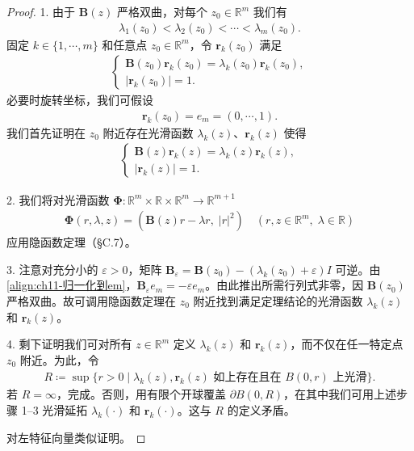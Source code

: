 \documentclass[../../main.tex]{subfiles}
\begin{document}
\begin{proof}
1. 由于 $\mathbf{B}(z)$ 严格双曲，对每个 $z_0\in\mathbb{R}^m$ 我们有
\begin{align*}
\lambda_1(z_0)<\lambda_2(z_0)<\cdots<\lambda_m(z_0).
\end{align*}
固定 $k\in\{1,\cdots,m\}$ 和任意点 $z_0\in\mathbb{R}^m$，令 $\mathbf{r}_k(z_0)$ 满足
\begin{align*}
\begin{cases}
\mathbf{B}(z_0)\mathbf{r}_k(z_0)=\lambda_k(z_0)\mathbf{r}_k(z_0),\\
|\mathbf{r}_k(z_0)|=1.
\end{cases}
\end{align*}
必要时旋转坐标，我们可假设
\begin{align}
\mathbf{r}_k(z_0)=e_m=(0,\cdots,1).
\label{align:ch11-归一化到em}
\end{align}
我们首先证明在 $z_0$ 附近存在光滑函数 $\lambda_k(z)$、$\mathbf{r}_k(z)$ 使得
\begin{align*}
\begin{cases}
\mathbf{B}(z)\mathbf{r}_k(z)=\lambda_k(z)\mathbf{r}_k(z),\\
|\mathbf{r}_k(z)|=1.
\end{cases}
\end{align*}

2. 我们将对光滑函数 $\boldsymbol{\Phi}:\mathbb{R}^m\times\mathbb{R}\times\mathbb{R}^m\to\mathbb{R}^{m+1}$
\begin{align*}
\boldsymbol{\Phi}(r,\lambda,z)=(\mathbf{B}(z)r-\lambda r,\;|r|^2) \quad (r,z\in\mathbb{R}^m,\;\lambda\in\mathbb{R})
\end{align*}
应用隐函数定理（\S C.7）。

3. 注意对充分小的 $\varepsilon>0$，矩阵 $\mathbf{B}_\varepsilon=\mathbf{B}(z_0)-(\lambda_k(z_0)+\varepsilon)I$ 可逆。由\eqref{align:ch11-归一化到em}，$\mathbf{B}_\varepsilon e_m=-\varepsilon e_m$。由此推出所需行列式非零，因 $\mathbf{B}(z_0)$ 严格双曲。故可调用隐函数定理在 $z_0$ 附近找到满足定理结论的光滑函数 $\lambda_k(z)$ 和 $\mathbf{r}_k(z)$。

4. 剩下证明我们可对所有 $z\in\mathbb{R}^m$ 定义 $\lambda_k(z)$ 和 $\mathbf{r}_k(z)$，而不仅在任一特定点 $z_0$ 附近。为此，令
\begin{align*}
R\coloneqq\sup\{r>0\mid \lambda_k(z),\mathbf{r}_k(z)\text{ 如上存在且在 }B(0,r)\text{ 上光滑}\}.
\end{align*}
若 $R=\infty$，完成。否则，用有限个开球覆盖 $\partial B(0,R)$，在其中我们可用上述步骤 1--3 光滑延拓 $\lambda_k(\cdot)$ 和 $\mathbf{r}_k(\cdot)$。这与 $R$ 的定义矛盾。

对左特征向量类似证明。
\end{proof}
\end{document}
